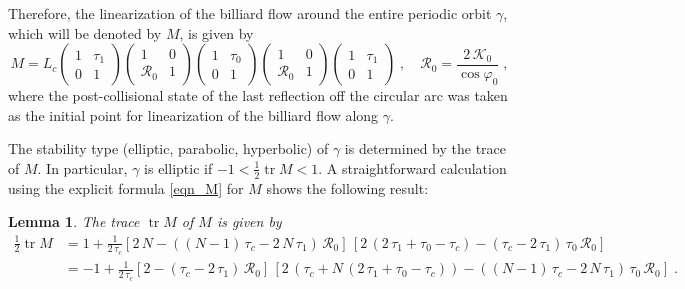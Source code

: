 \documentclass{amsart}
\theoremstyle{plain} %
\newtheorem{lemma}[theorem]{Lemma}
\begin{document}
Therefore, the linearization of the billiard flow around the entire periodic
orbit $\gamma$, which will be denoted by $M$, is given by
\begin{equation}
  \label{eqn_M}
  M
  =
  L_c
  \begin{pmatrix}
    1 & \tau_1 \\
    0 & 1
  \end{pmatrix}
  \begin{pmatrix}
    1 & 0 \\
    {\mathcal R}_0 & 1
  \end{pmatrix}
  \begin{pmatrix}
    1 & \tau_0 \\
    0 & 1
  \end{pmatrix}
  \begin{pmatrix}
    1 & 0 \\
    {\mathcal R}_0 & 1
  \end{pmatrix}
  \begin{pmatrix}
    1 & \tau_1 \\
    0 & 1
  \end{pmatrix}
  \;,\quad
  {\mathcal R}_0
  =
  \frac{2\,{\mathcal K}_0}{\cos\varphi_0}
  \;,
\end{equation}
where the post-collisional state of the last reflection off the
circular arc was taken as the initial point for linearization of the
billiard flow along $\gamma$.

The stability type (elliptic, parabolic, hyperbolic) of $\gamma$
is determined by the trace of $M$.
In particular, $\gamma$ is elliptic if $-1 < \frac{1}{2} \operatorname{tr} M < 1$.
A straightforward calculation using the explicit formula
\eqref{eqn_M} for $M$ shows the following result:
\begin{lemma}
  \label{lem_trM2}
  The trace $\operatorname{tr} M$ of $M$ is given by
  \begin{equation*}
    \begin{split}
      \frac{1}{2} \operatorname{tr} M
      &=
      1
      +
      \frac{1}{2\,\tau_c}
      [
      2\,N
      -
      (
      (N-1)\,\tau_c - 2\,N\,\tau_1
      )\,{\mathcal R}_0
      ]\,[
      2\,( 2\,\tau_1 + \tau_0 - \tau_c )
      -
      ( \tau_c - 2\,\tau_1 )\,\tau_0\,{\mathcal R}_0
      ]
      \\
      &=
      -
      1
      +
      \frac{1}{2\,\tau_c}
      [
      2
      -
      ( \tau_c - 2\,\tau_1 )\,{\mathcal R}_0
      ]\,[
      2\,( \tau_c + N\,( 2\,\tau_1 + \tau_0 - \tau_c ) )
      -
      ( (N-1)\,\tau_c - 2\,N\,\tau_1 )\,\tau_0\,{\mathcal R}_0
      ]
      \;.
    \end{split}
  \end{equation*}
\end{lemma}
\end{document}
